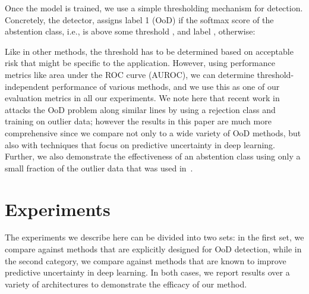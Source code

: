 \documentclass[accepted]{uai2021} \pdfoutput=1
\begin{document}
Once the model is trained, we use a simple thresholding mechanism for detection. Concretely, the detector,  assigns label 1 (OoD) if the softmax score of the abstention class, i.e.,  is above some threshold , and label , otherwise:

Like in other methods, the threshold  has to be determined based on acceptable risk that might be specific to the application. However, using performance metrics like area under the ROC curve (AUROC), we can determine threshold-independent performance of various methods, and we use this as one of our evaluation metrics in all our experiments. We note here that recent work in~\cite{mohseni2020self} attacks the OoD problem along similar lines by using a rejection class and training on outlier data; however the results in this paper are much more comprehensive since we compare not only to a wide variety of OoD methods, but also with techniques that focus on predictive uncertainty in deep learning. Further, we also demonstrate the effectiveness of an abstention class using only a small fraction of the outlier data that was used in~\cite{mohseni2020self}. 




\section{Experiments}
The experiments we describe here can be divided into two sets: in the first set, we compare against methods that are explicitly designed for OoD detection, while in the second category, we compare against methods that are known to improve predictive uncertainty in deep learning. In both cases, we report  results over a variety of architectures to demonstrate the efficacy of our method.
\end{document}
